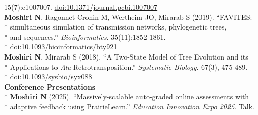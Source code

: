 \documentclass[margin,line]{res}
\begin{document}
\begin{resume}
\hspace*{8mm} 15(7):e1007007. \href{https://doi.org/10.1371/journal.pcbi.1007007}{doi:10.1371/journal.pcbi.1007007}\\
\hspace*{4mm} \textbf{Moshiri N}, Ragonnet-Cronin M, Wertheim JO, Mirarab S (2019). ``FAVITES:\\*
\hspace*{9.5mm} simultaneous simulation of transmission networks, phylogenetic trees,\\*
\hspace*{9.5mm} and sequences.'' \textit{Bioinformatics}. 35(11):1852-1861.\\*\vspace{2mm}
\hspace*{8mm} \href{https://doi.org/10.1093/bioinformatics/bty921}{doi:10.1093/bioinformatics/bty921}\\
\hspace*{4mm} \textbf{Moshiri N}, Mirarab S (2018). ``A Two-State Model of Tree Evolution and its\\*
\hspace*{9.5mm} Applications to \textit{Alu} Retrotransposition.'' \textit{Systematic Biology}. 67(3), 475-489.\\*\vspace{2mm}
\hspace*{8mm} \href{https://doi.org/10.1093/sysbio/syx088}{doi:10.1093/sysbio/syx088}
~\\
\textbf{Conference Presentations}\vspace{2mm}\\*
\hspace*{4mm} \textbf{Moshiri N} (2025). ``Massively-scalable auto-graded online assessments with\\*\vspace{2mm}
\hspace*{9.5mm} adaptive feedback using PrairieLearn.'' \textit{Education Innovation Expo 2025}. Talk.\\

\end{resume}
\end{document}
